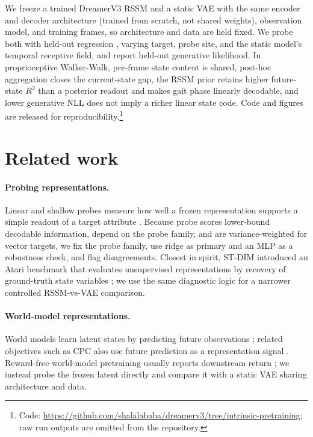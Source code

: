 \documentclass{article} %
\newcommand{\rtwo}{\ensuremath{R^2}}
\begin{document}
We freeze a trained DreamerV3 RSSM and a static VAE with the same encoder and
decoder architecture (trained from scratch, not shared weights), observation
model, and training frames, so architecture and data are held fixed. We probe
both with held-out regression \citep{alain2016probes}, varying target, probe
site, and the static model's temporal receptive field, and report held-out
generative likelihood. In proprioceptive Walker-Walk, per-frame state content is
shared, post-hoc aggregation closes the current-state gap, the RSSM prior
retains higher future-state \rtwo{} than a posterior readout and makes gait phase
linearly decodable, and lower generative NLL does not imply a richer linear state
code. Code and figures are released for reproducibility.\footnote{Code:
\url{https://github.com/shalalababa/dreamerv3/tree/intrinsic-pretraining};
raw run outputs are omitted from the repository.}

\section{Related work}
\paragraph{Probing representations.} Linear and shallow probes measure how well a
frozen representation supports a simple readout of a target attribute
\citep{alain2016probes}. Because probe scores lower-bound decodable information,
depend on the probe family, and are variance-weighted for vector targets, we fix
the probe family, use ridge as primary and an MLP as a robustness check, and flag
disagreements. Closest in spirit, ST-DIM introduced an Atari benchmark that
evaluates unsupervised representations by recovery of ground-truth state
variables \citep{anand2019atari}; we use the same diagnostic logic for a
narrower controlled RSSM-vs-VAE comparison.

\paragraph{World-model representations.} World models learn latent states by
predicting future observations
\citep{ha2018worldmodels,hafner2019planet,hafner2020dreamer,hafner2025dreamerv3};
related objectives such as CPC also use future prediction as a representation
signal \citep{oord2018cpc}. Reward-free world-model pretraining usually reports
downstream return \citep{sekar2020plan2explore,liu2021aps,laskin2021urlb}; we
instead probe the frozen latent directly and compare it with a static VAE
\citep{kingma2014vae,higgins2017betavae} sharing architecture and data.
\end{document}
